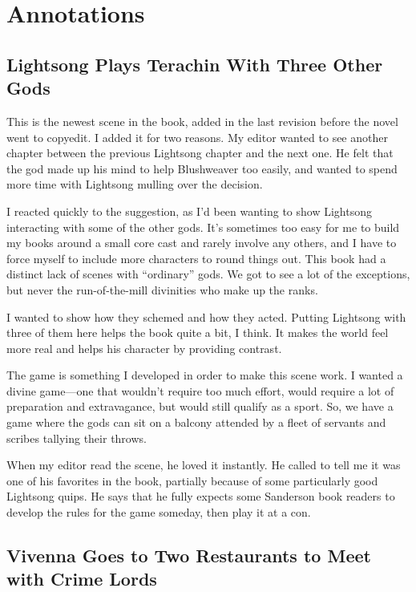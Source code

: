 \section*{Annotations}

\subsection*{Lightsong Plays Terachin With Three Other Gods}

This is the newest scene in the book, added in the last revision before the novel went to copyedit. I added it for two reasons. My editor wanted to see another chapter between the previous Lightsong chapter and the next one. He felt that the god made up his mind to help Blushweaver too easily, and wanted to spend more time with Lightsong mulling over the decision.

I reacted quickly to the suggestion, as I’d been wanting to show Lightsong interacting with some of the other gods. It’s sometimes too easy for me to build my books around a small core cast and rarely involve any others, and I have to force myself to include more characters to round things out. This book had a distinct lack of scenes with “ordinary” gods. We got to see a lot of the exceptions, but never the run-of-the-mill divinities who make up the ranks.

I wanted to show how they schemed and how they acted. Putting Lightsong with three of them here helps the book quite a bit, I think. It makes the world feel more real and helps his character by providing contrast.

The game is something I developed in order to make this scene work. I wanted a divine game—one that wouldn’t require too much effort, would require a lot of preparation and extravagance, but would still qualify as a sport. So, we have a game where the gods can sit on a balcony attended by a fleet of servants and scribes tallying their throws.

When my editor read the scene, he loved it instantly. He called to tell me it was one of his favorites in the book, partially because of some particularly good Lightsong quips. He says that he fully expects some Sanderson book readers to develop the rules for the game someday, then play it at a con.



\subsection*{Vivenna Goes to Two Restaurants to Meet with Crime Lords}

